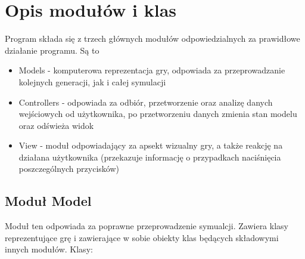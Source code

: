 \documentclass[10pt, oneside]{article}
\begin{document}
\section {Opis modułów i klas}
Program składa się z trzech głównych modułów odpowiedzialnych za prawidłowe działanie programu. Są to
\begin {itemize}
\item Models - komputerowa reprezentacja gry, odpowiada za przeprowadzanie kolejnych generacji, jak i całej symulacji
\item Controllers - odpowiada za odbiór, przetworzenie oraz analizę danych wejściowych od użytkownika, po przetworzeniu danych zmienia stan modelu oraz odświeża widok
\item View - moduł odpowiadający za apsekt wizualny gry, a także reakcję na działana użytkownika (przekazuje informację o przypadkach naciśnięcia poszczególnych przycisków)
\end{itemize}

\subsection {Moduł Model}
Moduł ten odpowiada za poprawne przeprowadzenie symualcji. Zawiera klasy reprezentujące grę i zawierające w sobie obiekty klas będących składowymi innych modułów.
Klasy:
\end{document}
